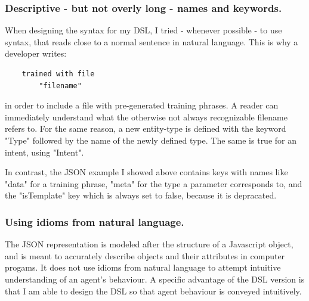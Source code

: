 \subsubsection{Descriptive - but not overly long - names and keywords.}

When designing the syntax for my DSL, I tried - whenever possible - to use syntax, that reads close to a normal sentence in natural language. This is why a developer writes: 
\begin{verbatim}
    trained with file
        "filename"
\end{verbatim}
in order to include a file with pre-generated training phrases. A reader can immediately understand what the otherwise not always recognizable filename refers to.
For the same reason, a new entity-type is defined with the keyword "Type" followed by the name of the newly defined type. The same is true for an intent, using "Intent".

In contrast, the JSON example I showed above contains keys with names like "data" for a training phrase, "meta" for the type a parameter corresponds to, and the "isTemplate" key which is always set to false, because it is depracated.

\subsubsection{Using idioms from natural language.}

The JSON representation is modeled after the structure of a Javascript object, and is meant to accurately describe objects and their attributes in computer progams. It does not use idioms from natural language to attempt intuitive understanding of an agent's behaviour.
A specific advantage of the DSL version is that I am able to design the DSL so that agent behaviour is conveyed intuitively. 

